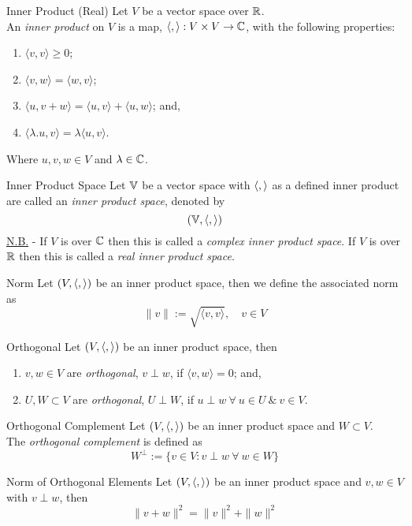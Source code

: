 \documentclass[11pt,a4paper]{article}
\begin{document}
\subtitle{Definition 9.02 - }{Inner Product (Real)}
Let $V$ be a vector space over $\mathbb{R}$.\\
An \textit{inner product} on $V$ is a map, $\langle , \rangle : V \times V \to \mathbb{C}$, with the following properties:
\begin{enumerate}[label=\roman*)]
  \item $\langle v, v \rangle \geq 0$;
  \item $\langle v, w \rangle = \langle w, v \rangle$;
  \item $\langle u, v + w \rangle = \langle u, v \rangle + \langle u, w \rangle$; and,
  \item $\langle \lambda.u , v \rangle = \lambda \langle u, v \rangle$.
\end{enumerate}
Where $u, v, w \in V$ and $\lambda \in \mathbb{C}$.\\

\subtitle{Definition 9.03 - }{Inner Product Space}
Let $\mathbb{V}$ be a vector space with $\langle , \rangle$ as a defined inner product are called an \textit{inner product space}, denoted by
$$(\mathbb{V}, \langle , \rangle)$$
\underline{N.B.} - If $V$ is over $\mathbb{C}$ then this is called a \textit{complex inner product space}. If $V$ is over $\mathbb{R}$ then this is called a \textit{real inner product space}.\\

\subtitle{Definition 9.04 - }{Norm}
Let $( V , \langle , \rangle )$ be an inner product space, then we define the associated norm as
$$\|v\| := \sqrt{\langle v, v \rangle},\quad v \in V$$

\subtitle{Definition 9.05 - }{Orthogonal}
Let $(V , \langle , \rangle)$ be an inner product space, then
\begin{enumerate}[label=\roman*)]
  \item $v, w \in V$ are \textit{orthogonal}, $v \perp w$, if $\langle v, w \rangle = 0$; and,
  \item $U, W \subset V$ are \textit{orthogonal}, $U \perp W$, if $u \perp w\ \forall\ u \in U\ \&\ v \in V$.
\end{enumerate}

\subtitle{Definition 9.06 - }{Orthogonal Complement}
Let $(V, \langle , \rangle)$ be an inner product space and $W \subset V$.\\
The \textit{orthogonal complement} is defined as
$$W^\perp := \{ v \in V : v \perp w\ \forall\ w \in W \}$$

\subtitle{Theorem 9.07 - }{Norm of Orthogonal Elements}
Let $(V, \langle , \rangle)$ be an inner product space and $v, w \in V$ with $v \perp w$, then
$$\|v + w\|^2 = \|v\|^2 + \|w\|^2$$
\end{document}
